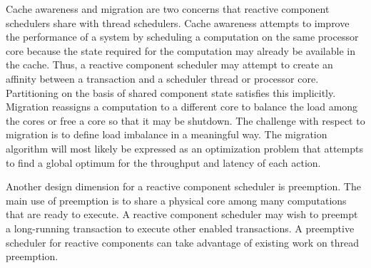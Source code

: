 Cache awareness and migration are two concerns that reactive component schedulers share with thread schedulers.
Cache awareness attempts to improve the performance of a system by scheduling a computation on the same processor core because the state required for the computation may already be available in the cache.
Thus, a reactive component scheduler may attempt to create an affinity between a transaction and a scheduler thread or processor core.
Partitioning on the basis of shared component state satisfies this implicitly.
Migration reassigns a computation to a different core to balance the load among the cores or free a core so that it may be shutdown.
The challenge with respect to migration is to define load imbalance in a meaningful way.
The migration algorithm will most likely be expressed as an optimization problem that attempts to find a global optimum for the throughput and latency of each action.

Another design dimension for a reactive component scheduler is preemption.
The main use of preemption is to share a physical core among many computations that are ready to execute.
A reactive component scheduler may wish to preempt a long-running transaction to execute other enabled transactions.
A preemptive scheduler for reactive components can take advantage of existing work on thread preemption.


